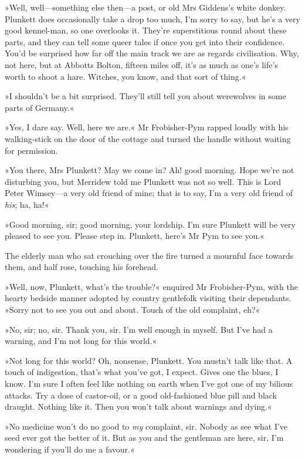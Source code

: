 »Well, well—something else then—a post, or old Mrs Giddens's white donkey. Plunkett does occasionally take a drop too much, I'm sorry to say, but he's a very good kennel-man, so one overlooks it. They're superstitious round about these parts, and they can tell some queer tales if once you get into their confidence. You'd be surprised how far off the main track we are as regards civilisation. Why, not here, but at Abbotts Bolton, fifteen miles off, it's as much as one's life's worth to shoot a hare. Witches, you know, and that sort of thing.«

»I shouldn't be a bit surprised. They'll still tell you about werewolves in some parts of Germany.«

»Yes, I dare say. Well, here we are.« Mr Frobisher-Pym rapped loudly with his walking-stick on the door of the cottage and turned the handle without waiting for permission.

»You there, Mrs Plunkett? May we come in? Ah! good morning. Hope we're not disturbing you, but Merridew told me Plunkett was not so well. This is Lord Peter Wimsey—a very old friend of mine; that is to say, I'm a very old friend of \textit{his}; ha, ha!«

»Good morning, sir; good morning, your lordship. I'm sure Plunkett will be very pleased to see you. Please step in. Plunkett, here's Mr Pym to see you.«

The elderly man who sat crouching over the fire turned a mournful face towards them, and half rose, touching his forehead.

»Well, now, Plunkett, what's the trouble?« enquired Mr Frobisher-Pym, with the hearty bedside manner adopted by country gentlefolk visiting their dependants. »Sorry not to see you out and about. Touch of the old complaint, eh?«

»No, sir; no, sir. Thank you, sir. I'm well enough in myself. But I've had a warning, and I'm not long for this world.«

»Not long for this world? Oh, nonsense, Plunkett. You mustn't talk like that. A touch of indigestion, that's what you've got, I expect. Gives one the blues, I know. I'm sure I often feel like nothing on earth when I've got one of my bilious attacks. Try a dose of castor-oil, or a good old-fashioned blue pill and black draught. Nothing like it. Then you won't talk about warnings and dying.«

»No medicine won't do no good to \textit{my} complaint, sir. Nobody as see what I've seed ever got the better of it. But as you and the gentleman are here, sir, I'm wondering if you'll do me a favour.«

